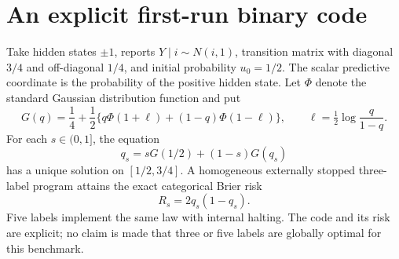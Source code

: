 \section{An explicit first-run binary code}\label{sec:benchmark}
\begin{proposition}\label{prop:binary}
Take hidden states $\pm1$, reports $Y\mid i\sim N(i,1)$, transition matrix with diagonal $3/4$ and off-diagonal $1/4$, and initial probability $u_0=1/2$. The scalar predictive coordinate is the probability of the positive hidden state. Let $\Phi$ denote the standard Gaussian distribution function and put
\begin{equation}\label{eq:binary-G}
 G(q)=\frac14+\frac12\{q\Phi(1+\ell)+(1-q)\Phi(1-\ell)\},
 \qquad \ell=\tfrac12\log\frac q{1-q}.
\end{equation}
For each $s\in(0,1]$, the equation
\begin{equation}\label{eq:binary-root}
 q_s=sG(1/2)+(1-s)G(q_s)
\end{equation}
has a unique solution on $[1/2,3/4]$. A homogeneous externally stopped three-label program attains the exact categorical Brier risk
\begin{equation}\label{eq:binary-risk}
 R_s=2q_s(1-q_s).
\end{equation}
Five labels implement the same law with internal halting. The code and its risk are explicit; no claim is made that three or five labels are globally optimal for this benchmark.
\end{proposition}
